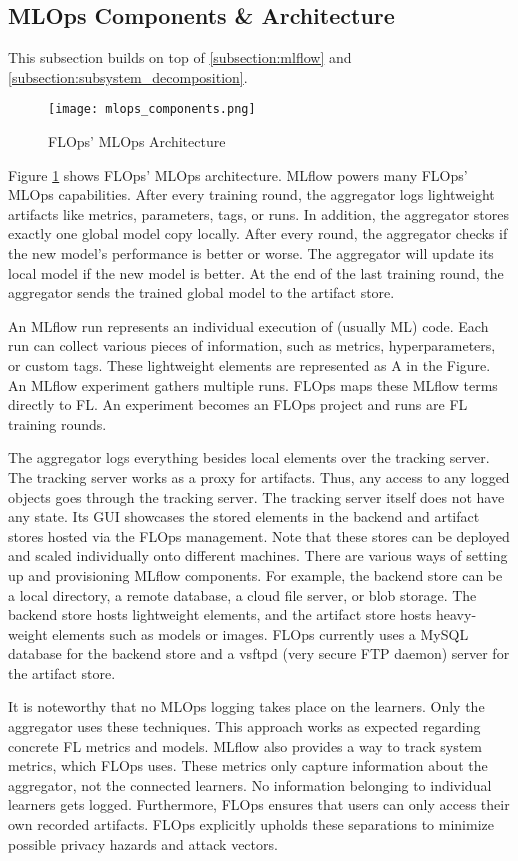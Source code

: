 \subsection{MLOps Components \& Architecture}

This subsection builds on top of \ref{subsection:mlflow} and \ref{subsection:subsystem_decomposition}.
\begin{figure}[h]
    \centering
    \texttt{[image: mlops\_components.png]}
    \caption{FLOps' MLOps Architecture}
    \label{fig:mlops_architecture}
\end{figure}
Figure \ref{fig:mlops_architecture} shows FLOps' MLOps architecture.
MLflow powers many FLOps' MLOps capabilities.
After every training round, the aggregator logs lightweight artifacts like metrics, parameters, tags, or runs.
In addition, the aggregator stores exactly one global model copy locally.
After every round, the aggregator checks if the new model's performance is better or worse.
The aggregator will update its local model if the new model is better.
At the end of the last training round, the aggregator sends the trained global model to the artifact store.

An MLflow run represents an individual execution of (usually ML) code.
Each run can collect various pieces of information, such as metrics, hyperparameters, or custom tags.
These lightweight elements are represented as A in the Figure.
An MLflow experiment gathers multiple runs.
FLOps maps these MLflow terms directly to FL.
An experiment becomes an FLOps project and runs are FL training rounds.

The aggregator logs everything besides local elements over the tracking server. 
The tracking server works as a proxy for artifacts.
Thus, any access to any logged objects goes through the tracking server.
The tracking server itself does not have any state.
Its GUI showcases the stored elements in the backend and artifact stores hosted via the FLOps management.
Note that these stores can be deployed and scaled individually onto different machines.
There are various ways of setting up and provisioning MLflow components.
For example, the backend store can be a local directory, a remote database, a cloud file server, or blob storage.
The backend store hosts lightweight elements, and the artifact store hosts heavy-weight elements such as models or images.
FLOps currently uses a MySQL database for the backend store and a vsftpd (very secure FTP daemon) server for the artifact store.

It is noteworthy that no MLOps logging takes place on the learners.
Only the aggregator uses these techniques.
This approach works as expected regarding concrete FL metrics and models.
MLflow also provides a way to track system metrics, which FLOps uses.
These metrics only capture information about the aggregator, not the connected learners.
No information belonging to individual learners gets logged.
Furthermore, FLOps ensures that users can only access their own recorded artifacts.
FLOps explicitly upholds these separations to minimize possible privacy hazards and attack vectors.